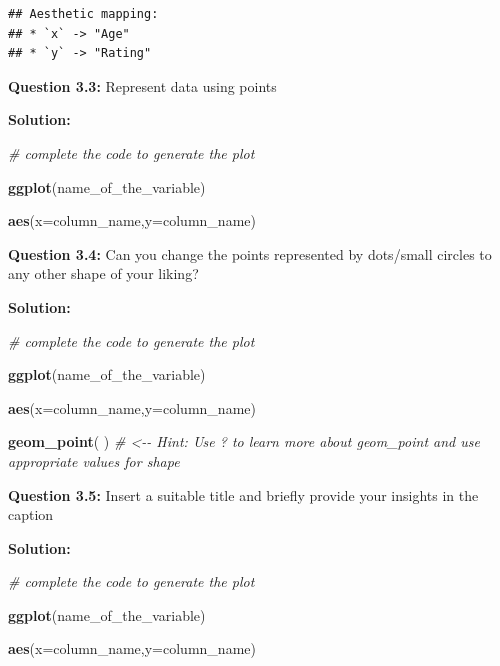 \documentclass[
]{article}
\newenvironment{Shaded}{\begin{snugshade}}{\end{snugshade}}
\newcommand{\AttributeTok}[1]{\textcolor[rgb]{0.13,0.29,0.53}{#1}}
\newcommand{\CommentTok}[1]{\textcolor[rgb]{0.56,0.35,0.01}{\textit{#1}}}
\newcommand{\FunctionTok}[1]{\textcolor[rgb]{0.13,0.29,0.53}{\textbf{#1}}}
\newcommand{\NormalTok}[1]{#1}
\begin{document}
\begin{verbatim}
## Aesthetic mapping: 
## * `x` -> "Age"
## * `y` -> "Rating"
\end{verbatim}

\textbf{Question 3.3:} Represent data using points

\textbf{Solution:}

\begin{Shaded}
\begin{Highlighting}[]
\CommentTok{\# complete the code to generate the plot}

\FunctionTok{ggplot}\NormalTok{(name\_of\_the\_variable) }

\FunctionTok{aes}\NormalTok{(}\AttributeTok{x=}\NormalTok{column\_name,}\AttributeTok{y=}\NormalTok{column\_name)}
\end{Highlighting}
\end{Shaded}

\textbf{Question 3.4:} Can you change the points represented by
dots/small circles to any other shape of your liking?

\textbf{Solution:}

\begin{Shaded}
\begin{Highlighting}[]
\CommentTok{\# complete the code to generate the plot}

\FunctionTok{ggplot}\NormalTok{(name\_of\_the\_variable) }

\FunctionTok{aes}\NormalTok{(}\AttributeTok{x=}\NormalTok{column\_name,}\AttributeTok{y=}\NormalTok{column\_name)}

\FunctionTok{geom\_point}\NormalTok{( ) }\CommentTok{\# \textless{}{-}{-} Hint: Use ? to learn more about geom\_point and use appropriate values for shape}
\end{Highlighting}
\end{Shaded}

\textbf{Question 3.5:} Insert a suitable title and briefly provide your
insights in the caption

\textbf{Solution:}

\begin{Shaded}
\begin{Highlighting}[]
\CommentTok{\# complete the code to generate the plot}

\FunctionTok{ggplot}\NormalTok{(name\_of\_the\_variable) }

\FunctionTok{aes}\NormalTok{(}\AttributeTok{x=}\NormalTok{column\_name,}\AttributeTok{y=}\NormalTok{column\_name)}
\end{Highlighting}
\end{Shaded}
\end{document}
